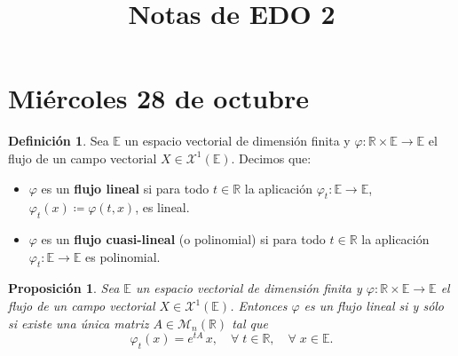 \documentclass[11pt,a4paper]{article}
\title{\textbf{Notas de EDO 2}}
\author{}
\date{}
\theoremstyle{definition}
\newtheorem{definicion}{Definición}[section]
\theoremstyle{plain}
\newtheorem{proposicion}{Proposición}[section]
\theoremstyle{remark}
\begin{document}
	\maketitle

	\section{Miércoles 28 de octubre}

	\begin{definicion}
		Sea $\mathbb{E}$ un espacio vectorial de dimensión finita y $\varphi : \mathbb{R} \times \mathbb{E} \to \mathbb{E}$ el flujo de un campo vectorial $X \in \mathcal{X}^1(\mathbb{E})$. Decimos que:
		\begin{itemize}
			\item $\varphi$ es un \textbf{flujo lineal} si para todo $t \in \mathbb{R}$ la aplicación $\varphi_t : \mathbb{E} \to \mathbb{E}$, $\varphi_t(x) \coloneqq \varphi(t,x)$, es lineal.
			\item $\varphi$ es un \textbf{flujo cuasi-lineal} (o polinomial) si para todo $t \in \mathbb{R}$ la aplicación $\varphi_t : \mathbb{E} \to \mathbb{E}$ es polinomial.
		\end{itemize}
	\end{definicion}

	\begin{proposicion}
		Sea $\mathbb{E}$ un espacio vectorial de dimensión finita y $\varphi : \mathbb{R} \times \mathbb{E} \to \mathbb{E}$ el flujo de un campo vectorial $X \in \mathcal{X}^1(\mathbb{E})$. Entonces $\varphi$ es un flujo lineal si y sólo si existe una única matriz $A \in \mathcal{M}_n(\mathbb{R})$ tal que
		\[
			\varphi_t(x) = e^{tA}\,x, \quad \forall \; t \in \mathbb{R}, \quad \forall \; x \in \mathbb{E}.
		\]
	\end{proposicion}
\end{document}
